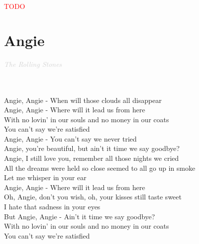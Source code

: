 \documentclass[a5paper, 10pt]{book}
\begin{document}
\begin{minipage}[t]{0.2\textwidth}
  \textcolor{red}{TODO}\\
\end{minipage}

\newpage
\section{Angie }\textcolor{lightgray}{\textit{The Rolling Stones}}\\~\\
\begin{minipage}[t]{0.8\textwidth}
  ~ \\
  Angie, Angie - When will those clouds all disappear\\
  Angie, Angie - Where will it lead us from here\\

  \hspace*{2mm} With no lovin' in our souls and no money in our coats\\
  \hspace*{2mm} You can't say we're satisfied\\

  Angie, Angie - You can't say we never tried\\

  Angie, you're beautiful, but ain't it time we say goodbye?\\
  Angie, I still love you, remember all those nights we cried\\

  \hspace*{2mm} All the dreams were held so close seemed to all go up in smoke\\
  \hspace*{2mm} Let me whisper in your ear\\

  Angie, Angie - Where will it lead us from here\\

  \hspace*{2mm} Oh, Angie, don't you wish, oh, your kisses still taste sweet\\
  \hspace*{2mm} I hate that sadness in your eyes\\

  But Angie, Angie - Ain't it time we say goodbye?\\

  \hspace*{2mm} With no lovin' in our souls and no money in our coats\\
  \hspace*{2mm} You can't say we're satisfied\\


\end{minipage}
\end{document}

